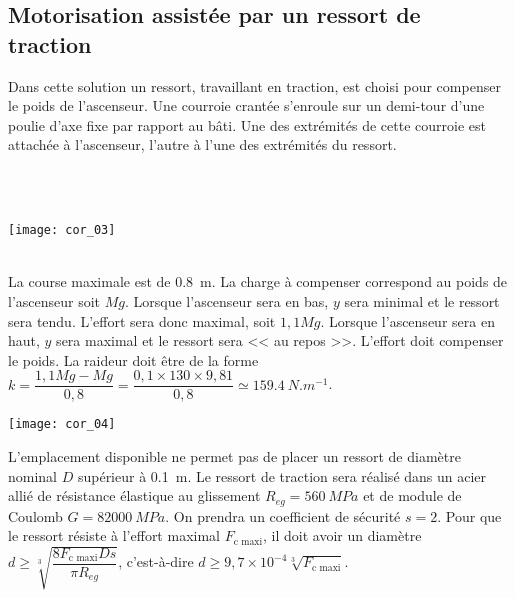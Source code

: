 \begin{multicols}{2}
\subsection*{Motorisation assistée par un ressort de traction}
Dans cette solution un ressort, travaillant en traction, est choisi pour compenser
le poids de l’ascenseur. Une courroie crantée s’enroule sur un demi-tour
d’une poulie d’axe fixe par rapport au bâti. Une des extrémités de cette courroie
est attachée à l’ascenseur, l’autre à l’une des extrémités du ressort.

\ifprof
\begin{corrige}~\\
~\\
\begin{center}
\texttt{[image: cor\_03]}
\end{center}

\end{corrige}
\else
\fi



\ifprof
\begin{corrige}~\\
La course maximale est de \SI{0,8}{m}. La charge à compenser correspond au poids de l'ascenseur soit $Mg$. 
Lorsque l'ascenseur sera en bas, $y$ sera minimal et le ressort sera tendu. L'effort sera donc maximal, soit $1,1 Mg$.
Lorsque l'ascenseur sera en haut, $y$ sera maximal et le ressort sera  << au repos >>. L'effort doit compenser le poids.
La raideur doit être de la forme $k=\dfrac{1,1Mg - Mg}{0,8} = \dfrac{0,1 \times 130 \times 9,81 }{0,8}\simeq \SI{159,4}{N.m^{-1}}$.
\begin{center}
\texttt{[image: cor\_04]}
\end{center}
\end{corrige}
\else
\fi

\ifprof
\else
L’emplacement disponible ne permet pas de placer un ressort de diamètre
nominal $D$ supérieur à \SI{0,1}{m}. Le ressort de traction sera réalisé dans un acier
allié de résistance élastique au glissement $R_{eg}=\SI{560}{MPa}$ et de module de Coulomb $G=\SI{82000}{MPa}$. On prendra un coefficient de sécurité $s=2$. Pour que le
ressort résiste à l’effort maximal $F_{\text{c maxi}}$, il doit avoir un diamètre
$d\geq \sqrt[3]{\dfrac{8 F_{\text{c maxi}} D s}{\pi R_{eg}}}$, 
c'est-à-dire $d\geq 9,7 \times 10^{-4}\sqrt[3]{F_{\text{c maxi}}}$.


\end{multicols}
